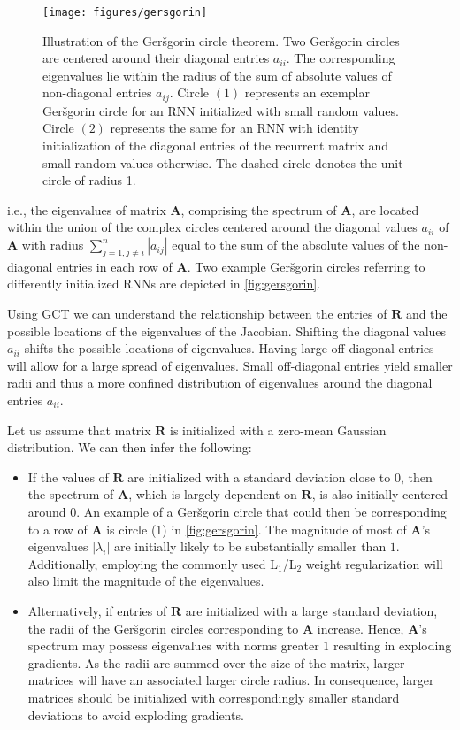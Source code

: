 \documentclass[letterpaper]{article}
\def\gers{Ger\v{s}gorin}
\def\Amat{\mathbf{A}}
\def\Rmat{\mathbf{R}}
\begin{document}
\begin{figure}
\begin{center}
\texttt{[image: figures/gersgorin]}
\caption{Illustration of the \gers{} circle theorem. Two \gers{} circles are centered around their diagonal entries $a_{ii}$. The corresponding eigenvalues lie within the radius of the sum of absolute values of non-diagonal entries $a_{ij}$. Circle $(1)$ represents an exemplar \gers{} circle for an RNN initialized with small random values. Circle $(2)$ represents the same for an RNN with identity initialization of the diagonal entries of the recurrent matrix and small random values otherwise. The dashed circle denotes the unit circle of radius 1.}
\label{fig:gersgorin}
\end{center}
\end{figure}

i.e., the eigenvalues of matrix $\Amat$, comprising the spectrum of $\Amat$, are located within the union of the complex circles centered around the diagonal values $a_{ii}$ of $\Amat$ with radius $\sum_{j=1, j \neq i}^n |a_{ij}|$ equal to the sum of the absolute values of the non-diagonal entries in each row of $\Amat$. Two example \gers{} circles referring to differently initialized RNNs are depicted in \autoref{fig:gersgorin}.

Using GCT we can understand the relationship between the entries of $\Rmat{}$ and the possible locations of the eigenvalues of the Jacobian.
Shifting the diagonal values $a_{ii}$ shifts the possible locations of eigenvalues. 
Having large off-diagonal entries will allow for a large spread of eigenvalues. Small off-diagonal entries yield smaller radii and thus a more confined distribution of eigenvalues around the diagonal entries $a_{ii}$.

Let us assume that matrix $\Rmat$ is initialized with a zero-mean Gaussian distribution. We can then infer the following:

\begin{itemize}\item If the values of $\Rmat$ are initialized with a standard deviation close to $0$, then the spectrum of $\Amat$, which is largely dependent on $\Rmat$, is also initially centered around $0$. An example of a \gers{} circle that could then be corresponding to a row of $\Amat$ is circle (1) in \autoref{fig:gersgorin}.
The magnitude of most of $\Amat$'s eigenvalues $|\lambda_i|$ are initially likely to be substantially smaller than $1$.
Additionally, employing the commonly used L$_1$/L$_2$ weight regularization will also limit the magnitude of the eigenvalues.

\item Alternatively, if entries of $\Rmat$ are initialized with a large standard deviation, the radii of the \gers{} circles corresponding to $\Amat$ increase. Hence, $\Amat$'s spectrum may possess eigenvalues with norms greater $1$ resulting in exploding gradients.
As the radii are summed over the size of the matrix, larger matrices will have an associated larger circle radius.
In consequence, larger matrices should be initialized with correspondingly smaller standard deviations to avoid exploding gradients.

\end{itemize}
\end{document}
